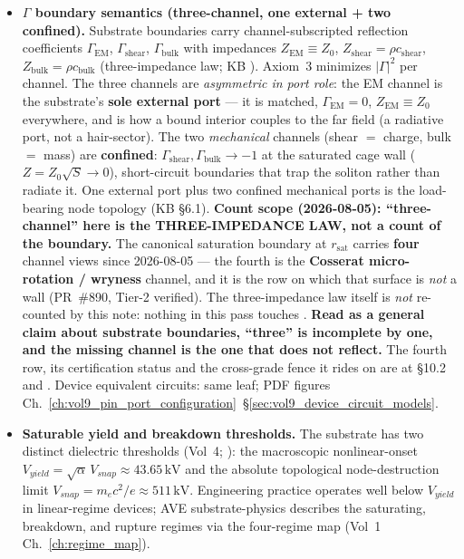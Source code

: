 \begin{itemize}
    \item \textbf{$\Gamma$ boundary semantics (three-channel, one external + two confined).} Substrate boundaries carry channel-subscripted reflection coefficients $\Gamma_{\mathrm{EM}}$, $\Gamma_{\mathrm{shear}}$, $\Gamma_{\mathrm{bulk}}$ with impedances $Z_{\mathrm{EM}} \equiv Z_0$, $Z_{\mathrm{shear}} = \rho c_{\mathrm{shear}}$, $Z_{\mathrm{bulk}} = \rho c_{\mathrm{bulk}}$ (three-impedance law; KB ). Axiom~3 minimizes $|\Gamma|^2$ per channel. The three channels are \emph{asymmetric in port role}: the EM channel is the substrate's \textbf{sole external port} --- it is matched, $\Gamma_{\mathrm{EM}} = 0$, $Z_{\mathrm{EM}} \equiv Z_0$ everywhere, and is how a bound interior couples to the far field (a radiative port, not a hair-sector). The two \emph{mechanical} channels (shear $=$ charge, bulk $=$ mass) are \textbf{confined}: $\Gamma_{\mathrm{shear}}, \Gamma_{\mathrm{bulk}} \to -1$ at the saturated cage wall ($Z = Z_0\sqrt{S} \to 0$), short-circuit boundaries that trap the soliton rather than radiate it. One external port plus two confined mechanical ports is the load-bearing node topology (KB  \S6.1). \textbf{Count scope (2026-08-05): ``three-channel'' here is the THREE-IMPEDANCE LAW, not a count of the boundary.} The canonical saturation boundary at $r_{\mathrm{sat}}$ carries \textbf{four} channel views since 2026-08-05 --- the fourth is the \textbf{Cosserat micro-rotation / wryness} channel, and it is the row on which that surface is \emph{not} a wall (PR~\#890, Tier-2 verified). The three-impedance law itself is \emph{not} re-counted by this note: nothing in this pass touches . \textbf{Read as a general claim about substrate boundaries, ``three'' is incomplete by one, and the missing channel is the one that does not reflect.} The fourth row, its certification status and the cross-grade fence it rides on are at  \S10.2 and . Device equivalent circuits: same leaf; PDF figures Ch.~\ref{ch:vol9_pin_port_configuration}~\S\ref{sec:vol9_device_circuit_models}.
    \item \textbf{Saturable yield and breakdown thresholds.} The substrate has two distinct dielectric thresholds (Vol~4; ): the macroscopic nonlinear-onset $V_{yield} = \sqrt{\alpha}\, V_{snap} \approx 43.65\,\text{kV}$ and the absolute topological node-destruction limit $V_{snap} = m_e c^2/e \approx 511\,\text{kV}$. Engineering practice operates well below $V_{yield}$ in linear-regime devices; AVE substrate-physics describes the saturating, breakdown, and rupture regimes via the four-regime map (Vol~1 Ch.~\ref{ch:regime_map}).

\end{itemize}
